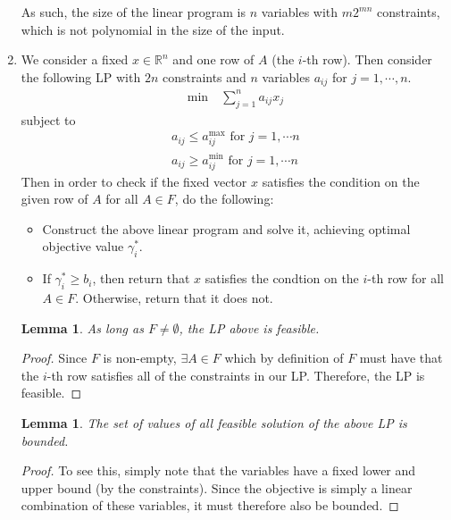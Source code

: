 \documentclass[12pt]{exam}
\newtheorem{lemma}[theorem]{Lemma}
\begin{document}
\begin{questions}
\begin{solution}
\begin{enumerate}[label=(\alph*)]
      As such, the size of the linear program is $n$ variables with $m2^{mn}$ constraints, which is not polynomial in the size of the input.

    \item
      We consider a fixed $x \in \mathbb{R}^n$ and one row of $A$ (the $i$-th row). Then consider the following LP with $2n$ constraints and $n$ variables $a_{ij}$ for $j = 1, \cdots, n$.
      \begin{align}
        \text{min} \quad \sum_{j=1}^n a_{ij}x_j
      \end{align}
      subject to
      \begin{align}
        a_{ij} \leq a_{ij}^{\max} \text{ for } j = 1, \cdots n \\
        a_{ij} \geq a_{ij}^{\min} \text{ for } j = 1, \cdots n
      \end{align}
      Then in order to check if the fixed vector $x$ satisfies the condition on the given row of $A$ for all $A \in F$, do the following:
      \begin{itemize}
        \item Construct the above linear program and solve it, achieving optimal objective value $\gamma_i^*$.
        \item If $\gamma_i^* \geq b_i$, then return that $x$ satisfies the condtion on the $i$-th row for all $A \in F$. Otherwise, return that it does not.
      \end{itemize}

      \begin{lemma}
        As long as $F \neq \emptyset$, the LP above is feasible.
      \end{lemma}
      \begin{proof}
       Since $F$ is non-empty, $\exists A \in F$ which by definition of $F$ must have that the $i$-th row satisfies all of the constraints in our LP. Therefore, the LP is feasible.
      \end{proof}

      \begin{lemma}
        The set of values of all feasible solution of the above LP is bounded.
      \end{lemma}
      \begin{proof}
        To see this, simply note that the variables have a fixed lower and upper bound (by the constraints). Since the objective is simply a linear combination of these variables, it must therefore also be bounded.
      \end{proof}


\end{enumerate}
\end{solution}
\end{questions}
\end{document}
